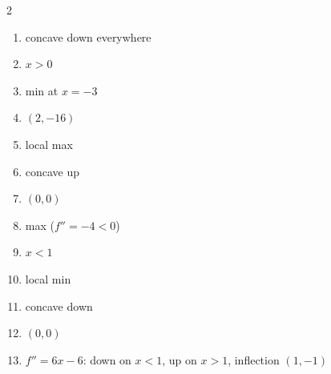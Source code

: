 \documentclass[11pt]{article}
\begin{document}
\begin{keybox}
\begin{multicols}{2}
\small
\begin{enumerate}[leftmargin=*,itemsep=3pt]
  \item concave down everywhere
  \item $x>0$
  \item min at $x=-3$
  \item $(2,-16)$
  \item local max
  \item concave up
  \item $(0,0)$
  \item max ($f''=-4<0$)
  \item $x<1$
  \item local min
  \item concave down
  \item $(0,0)$
  \item $f''=6x-6$: down on $x<1$, up on $x>1$, inflection $(1,-1)$
\end{enumerate}
\end{multicols}
\end{keybox}
\end{document}
